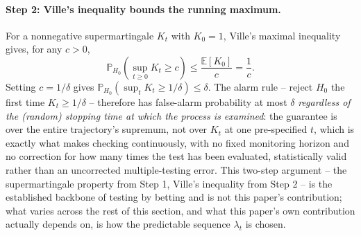 \paragraph{Step 2: Ville's inequality bounds the running maximum.}
For a nonnegative supermartingale $K_t$ with $K_0 = 1$, Ville's maximal inequality gives, for any $c > 0$,
\[
\mathbb{P}_{H_0}\!\left(\sup_{t \ge 0} K_t \ge c\right) \le \frac{\mathbb{E}[K_0]}{c} = \frac{1}{c}.
\]
Setting $c = 1/\delta$ gives $\mathbb{P}_{H_0}\!\left(\sup_t K_t \ge 1/\delta\right) \le \delta$. The alarm rule -- reject $H_0$ the first time $K_t \ge 1/\delta$ -- therefore has false-alarm probability at most $\delta$ \emph{regardless of the (random) stopping time at which the process is examined}: the guarantee is over the entire trajectory's supremum, not over $K_t$ at one pre-specified $t$, which is exactly what makes checking continuously, with no fixed monitoring horizon and no correction for how many times the test has been evaluated, statistically valid rather than an uncorrected multiple-testing error. This two-step argument -- the supermartingale property from Step 1, Ville's inequality from Step 2 -- is the established backbone of testing by betting and is not this paper's contribution; what varies across the rest of this section, and what this paper's own contribution actually depends on, is how the predictable sequence $\lambda_t$ is chosen.

